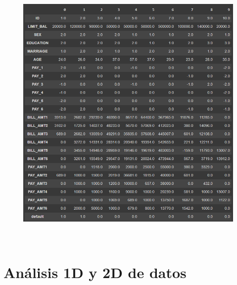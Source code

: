 \documentclass[12pt]{report}
\renewcommand{\_}{\kern-1.5pt\textunderscore\kern-1.5pt}
\begin{document}
\begin{figure}[H]
	\begin{Center}
		\includegraphics[width=5.21in,height=5.39in]{./media/image6.png}
	\end{Center}
\end{figure}




\vspace{\baselineskip}
\vspace{\baselineskip}

\vspace{\baselineskip}

\vspace{\baselineskip}

\vspace{\baselineskip}

\vspace{\baselineskip}

\vspace{\baselineskip}

\vspace{\baselineskip}
\section{Análisis 1D y 2D de datos}
\end{document}
